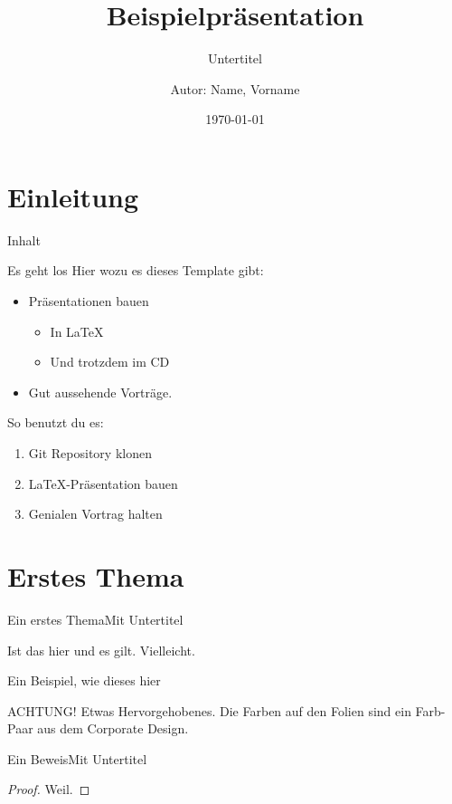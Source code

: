 \documentclass[german,10pt,xcolor=colortbl,compress,aspectratio=169
]{beamer}
\title{Beispielpräsentation}
\subtitle{Untertitel}
\date[]{\today}
\author[Autor in Fußzeile]{Autor: Name, Vorname}
\institute[]{Fachbereich xy\\RPTU in Kaiserslautern}
\begin{document}
\maketitle
\section{Einleitung}
\begin{frame}{Inhalt}
	\tableofcontents
\end{frame}
\begin{frame}{Es geht los}
	Hier wozu es dieses Template gibt:
	\begin{itemize}
		\item Präsentationen bauen
		      \begin{itemize}
			      \item In \LaTeX
			      \item Und trotzdem im CD
		      \end{itemize}
		\item Gut aussehende Vorträge.
	\end{itemize}
	So benutzt du es:
	\begin{enumerate}
		\item Git Repository klonen
		\item \LaTeX-Präsentation bauen
		\item Genialen Vortrag halten
	\end{enumerate}
\end{frame}
\section{Erstes Thema}
\begin{frame}{Ein erstes Thema}{Mit Untertitel}
	\begin{lemma}
		Ist das hier und es gilt. Vielleicht.
	\end{lemma}
	\begin{example}
		Ein Beispiel, wie dieses hier
	\end{example}
	\alert{ACHTUNG!}
	Etwas Hervorgehobenes. Die Farben auf den Folien sind ein Farb-Paar aus dem Corporate Design.\\

\end{frame}
\begin{frame}{Ein Beweis}{Mit Untertitel}
	\begin{proof}
		Weil.
	\end{proof}
\end{frame}
\end{document}
